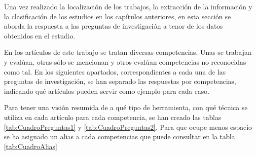 Una vez realizado la localización de los trabajos, la extracción de la información y la clasificación de los estudios en los capítulos anteriores, en esta sección se aborda la respuesta a las preguntas de investigación a tenor de los datos obtenidos en el estudio.



En los artículos de este trabajo se tratan diversas competencias. Unas se trabajan y evalúan, otras sólo se mencionan y otros evalúan competencias no reconocidas como tal. En los siguientes apartados, correspondientes a cada una de las preguntas de investigación, se han separado las respuestas por competencias, indicando qué artículos pueden servir como ejemplo para cada caso. 

Para tener una visión resumida de a qué tipo de herramienta, con qué técnica se utiliza en cada artículo para cada competencia, se han creado las tablas \ref{tab:CuadroPreguntas1} y \ref{tab:CuadroPreguntas2}. Para que ocupe menos espacio se ha asignado un alias a cada competencias que puede consultar en la tabla \ref{tab:CuadroAlias}


